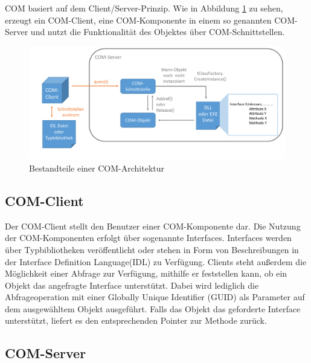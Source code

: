 COM basiert auf dem Client/Server-Prinzip. Wie in Abbildung \ref{GL_COM} zu sehen, erzeugt ein COM-Client, eine COM-Komponente in einem so genannten COM-Server und nutzt die Funktionalität des Objektes über COM-Schnittstellen. 

\begin{figure}[htbp]
	\centering
  \includegraphics[width=1.0\textwidth, width=1.0\textwidth]{pics/Grundlagen_com.pdf}
	\caption{Bestandteile einer COM-Architektur}
	\label{GL_COM}
\end{figure} 

\subsection{COM-Client}
\label{ch:grundlagen:sec:ComponentObjectModel:subsec:COMClient}

Der COM-Client stellt den Benutzer einer COM-Komponente dar. Die Nutzung der COM-Komponenten erfolgt über sogenannte Interfaces. Interfaces werden über Typbibliotheken veröffentlicht oder stehen in Form von Beschreibungen in der Interface Definition Language(IDL) zu Verfügung. Clients steht außerdem die Möglichkeit einer Abfrage zur Verfügung, mithilfe er feststellen kann, ob ein Objekt das angefragte Interface unterstützt. Dabei wird lediglich die Abfrageoperation mit einer  Globally Unique Identifier (GUID) als Parameter auf dem ausgewähltem Objekt ausgeführt. Falls das Objekt das geforderte Interface unterstützt, liefert es den entsprechenden Pointer zur Methode zurück.  

\subsection{COM-Server}
\label{ch:grundlagen:sec:ComponentObjectModel:subsec:COMServer}

